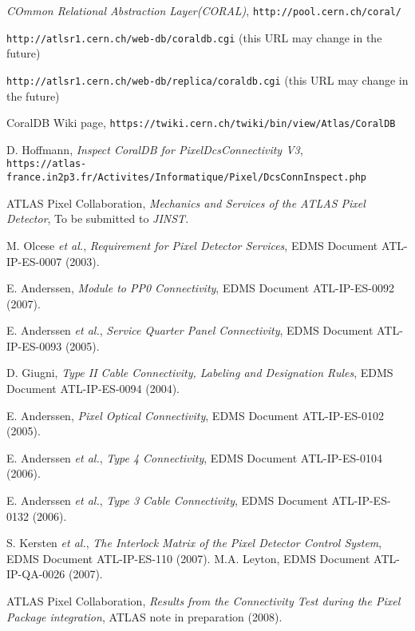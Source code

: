 \documentclass[12pt,twoside]{article}
\begin{document}
%
%
\begin{thebibliography}{99}

  {\it COmmon Relational Abstraction Layer(CORAL)}, {\tt http://pool.cern.ch/coral/}

  {\tt http://atlsr1.cern.ch/web-db/coraldb.cgi} (this URL may change in the future)

  {\tt http://atlsr1.cern.ch/web-db/replica/coraldb.cgi} (this URL may change in the future)

  CoralDB Wiki page, {\tt https://twiki.cern.ch/twiki/bin/view/Atlas/CoralDB}

  D. Hoffmann, {\it Inspect CoralDB for PixelDcsConnectivity V3},\\ {\tt https://atlas-france.in2p3.fr/Activites/Informatique/Pixel/DcsConnInspect.php}

 ATLAS Pixel Collaboration, {\it Mechanics and Services of the ATLAS Pixel Detector}, To be submitted to {\it JINST}.

 M. Olcese {\it et al.}, {\it Requirement for Pixel Detector Services}, EDMS Document ATL-IP-ES-0007 (2003).

 E. Anderssen, {\it Module to PP0 Connectivity}, EDMS Document ATL-IP-ES-0092 (2007).

 E. Anderssen {\it et al.}, {\it Service Quarter Panel Connectivity}, EDMS Document ATL-IP-ES-0093 (2005).

 D. Giugni, {\it Type II Cable Connectivity, Labeling and Designation Rules}, EDMS Document ATL-IP-ES-0094 (2004).

 E. Anderssen, {\it Pixel Optical Connectivity}, EDMS Document ATL-IP-ES-0102 (2005).

 E. Anderssen {\it et al.}, {\it Type 4 Connectivity}, EDMS Document ATL-IP-ES-0104 (2006).

 E. Anderssen {\it et al.}, {\it Type 3 Cable Connectivity}, EDMS Document ATL-IP-ES-0132 (2006).

 S. Kersten {\it et al.}, {\it The Interlock Matrix of the Pixel Detector Control System}, EDMS Document ATL-IP-ES-110 (2007).
 M.A. Leyton, EDMS Document ATL-IP-QA-0026 (2007).

 ATLAS Pixel Collaboration, {\it  Results from the Connectivity Test during the Pixel Package integration}, ATLAS note in preparation (2008).

\end{thebibliography}
\end{document}

